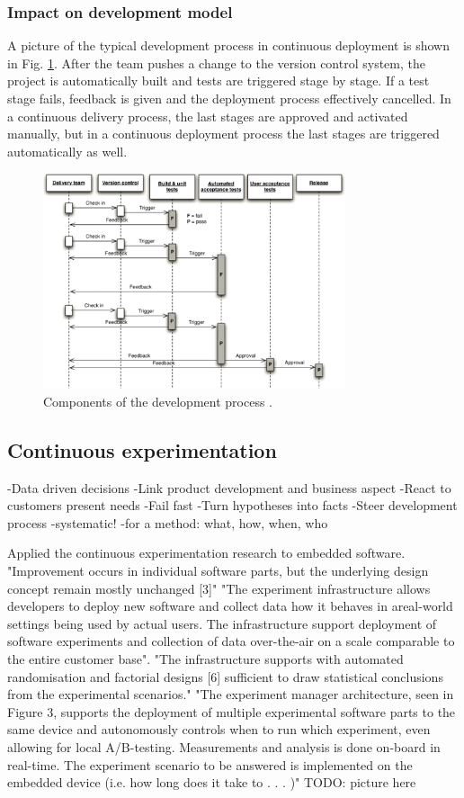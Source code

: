 \documentclass[english]{tktltiki2}
\theoremstyle{definition}
\theoremstyle{remark}
\begin{document}
\subsubsection{Impact on development model}

A picture of the typical development process in continuous deployment is shown in Fig. \ref{fig3}. After the team pushes a change to the version control system, the project is automatically built and tests are triggered stage by stage. If a test stage fails, feedback is given and the deployment process effectively cancelled. In a continuous delivery process, the last stages are approved and activated manually, but in a continuous deployment process the last stages are triggered automatically as well.

\begin{figure}[h]
	\centering
	\includegraphics[width=3.5in]{developmentprocess.jpg}
	\caption{Components of the development process \cite{cdbook}.}
	\label{fig3}
\end{figure}

\subsection{Continuous experimentation}

-Data driven decisions
-Link product development and business aspect
-React to customers present needs
-Fail fast
-Turn hypotheses into facts
-Steer development process
-systematic!
-for a method: what, how, when, who

\cite{eklund2012architecture}
Applied the continuous experimentation research to embedded software.
"Improvement occurs in individual software parts, but the underlying design concept remain mostly unchanged [3]"
"The experiment infrastructure allows developers to deploy new software and collect data how it behaves in areal-world settings being used by actual users. The infrastructure support deployment of software experiments and collection of data over-the-air on a scale comparable to the entire customer base". 
"The infrastructure supports with automated randomisation and factorial designs [6] sufficient to draw statistical conclusions from the experimental scenarios."
"The experiment manager architecture, seen in Figure 3, supports the deployment of multiple experimental software parts to the same device and autonomously controls when to run which experiment, even allowing for local A/B-testing. Measurements and analysis is done on-board in real-time. The experiment scenario to be answered is implemented on the embedded device (i.e. how long does it take to . . . )"
TODO: picture here
\end{document}
